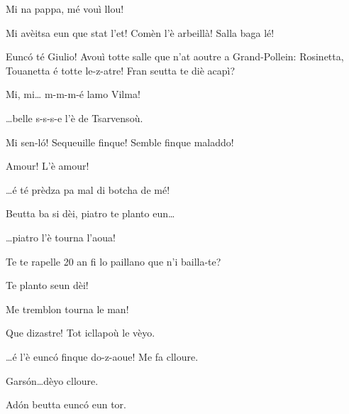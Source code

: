 \begin{drama}
\Vilmaspeaks Mi na pappa, mé vouì  llou!

\Pinospeaks{} Mi avèitsa eun que stat l'et! Comèn l'è arbeillà! Salla baga lé!

\Selmospeaks Eunc\'o té Giulio! Avouì totte salle que n'at aoutre a Grand-Pollein: Rosinetta, Touanetta é totte le-z-atre! Fran seutta te diè acapì?

\Giuliospeaks{} Mi, mi\ldots {} m-m-m-é lamo Vilma!


\Giuliospeaks \ldots belle s-s-s-e l'è de Tsarvensoù.

\Pinospeaks{} Mi sen-l\'o! Sequeuille finque!  Semble finque maladdo!

\Dinospeaks Amour! L'è amour!




\Selmospeaks \ldots é té prèdza pa mal di botcha de mé!

\Pinospeaks Beutta ba si dèi, piatro te planto eun\ldots

\Selmospeaks \ldots piatro l'è tourna l'aoua!

\Pinospeaks{} Te te rapelle 20 an fi lo paillano que n'i bailla-te? 

\Selmospeaks{} Te planto seun dèi!

\Pinospeaks{} Me tremblon tourna le man!


\Dorinaspeaks Que dizastre! Tot icllapoù le vèyo.

\Genespeaks \ldots é l'è eunc\'o finque do-z-aoue! Me fa clloure.

\Genespeaks{} Gars\'on\ldots dèyo clloure.

\Marteunspeaks Ad\'on beutta eunc\'o eun tor.


\end{drama}

